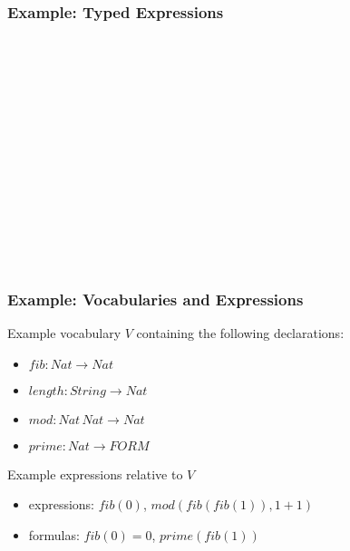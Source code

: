 \begin{frame}\frametitle{Example: Typed Expressions}
\small
\begin{commgrammar}
\\
\\
\\
\\
\\
\\
\\
\\
\\
\\
\\
\\
\\
\end{commgrammar}
\end{frame}

\begin{frame}\frametitle{Example: Vocabularies and Expressions}
Example vocabulary $V$ containing the following declarations:
\begin{itemize}
\item $fib:Nat \to Nat$
\item $length: String \to Nat$
\item $mod: Nat\,Nat \to Nat$
\item $prime: Nat \to FORM$
\end{itemize}

Example expressions relative to $V$
\begin{itemize}
\item expressions: $fib(0)$, $mod(fib(fib(1)),1+1)$
\item formulas: $fib(0)=0$, $prime(fib(1))$
\end{itemize}
\end{frame}


